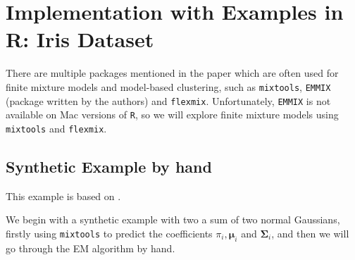 \documentclass{article}\usepackage[]{graphicx}\usepackage[]{xcolor}
\theoremstyle{plain}
\theoremstyle{definition}
\theoremstyle{remark}
\newcommand{\boldmu}{\boldsymbol{\mu}}
\newcommand{\boldSigma}{\boldsymbol{\Sigma}}
\begin{document}
\section{Implementation with Examples in R: Iris Dataset}\label{sec:Iris}

There are multiple packages mentioned in the paper which are often used for finite mixture models and model-based clustering, such as \texttt{mixtools}, \texttt{EMMIX} (package written by the authors) and \texttt{flexmix}. Unfortunately, \texttt{EMMIX} is not available on Mac versions of \texttt{R}, so we will explore finite mixture models using \texttt{mixtools} and \texttt{flexmix}.

\subsection{Synthetic Example by hand}
This example is based on \cite{EM_Implementation}.



We begin with a synthetic example with two a sum of two normal Gaussians, firstly using \texttt{mixtools} to predict the coefficients $\pi_i, \boldmu_i$ and $\boldSigma_i$, and then we will go through the EM algorithm by hand.
\end{document}
